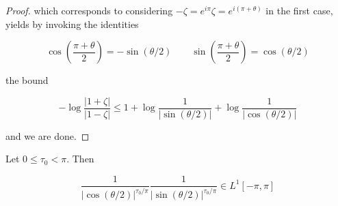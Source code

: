 \begin{proof}
	which corresponds to considering $-\zeta = e^{i\pi}\zeta = e^{i(\pi + \theta)}$ in the first case, yields by invoking the identities

	\begin{equation*}
		\cos\left( \frac{\pi + \theta}{2}\right) = -\sin(\theta/2) \qquad \sin\left( \frac{\pi + \theta}{2} \right) = \cos(\theta/2)
	\end{equation*}

	the bound 

	\begin{equation*}
		-\log \frac{\left| 1 + \zeta \right|}{\left| 1 - \zeta \right|} \leq 1 + \log \frac{1}{\left| \sin(\theta/2)\right|} + \log \frac{1}{\left| \cos(\theta/2)\right|}	 
	\end{equation*}

	and we are done.
\end{proof}

\begin{lemma}
	Let $0 \leq \tau_0 < \pi$. Then 

	\begin{equation*}
		\frac{1}{\left| \cos(\theta/2) \right|^{\tau_0/\pi}}\frac{1}{\left| \sin(\theta/2) \right|^{\tau_0/\pi}} \in L^1[-\pi,\pi]
	\end{equation*}
\end{lemma}

